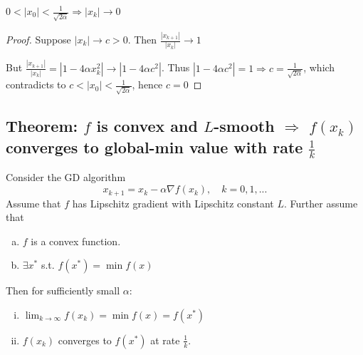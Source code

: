 \documentclass[11pt]{elegantbook}
\begin{document}
\begin{proposition}
    $0<|x_0|<\frac{1}{\sqrt{2\alpha}} \Rightarrow |x_k| \rightarrow	0$
\end{proposition}
\begin{proof}
Suppose $|x_k| \rightarrow	c>0$. Then $\frac{|x_{k+1}|}{|x_k|} \rightarrow	1$

But $\frac{|x_{k+1}|}{|x_k|} = |1-4\alpha x_k^2| \rightarrow |1-4\alpha c^2|$. Thus $|1-4\alpha c^2|=1 \Rightarrow	c=\frac{1}{\sqrt{2\alpha}}$, which contradicts to $c<|x_0|<\frac{1}{\sqrt{2\alpha}}$, hence $c=0$

\end{proof}

\subsection{Theorem: $f$ is convex and $L$-smooth $\Rightarrow$ $f(x_k)$ converges to global-min value with rate $\frac{1}{k}$}
\begin{theorem}
Consider the GD algorithm $$x_{k+1}=x_k-\alpha \nabla f(x_k),\quad k=0,1,...$$
Assume that $f$ has Lipschitz gradient with Lipschitz constant $L$. Further assume that
\begin{enumerate}[(a)]
    \item $f$ is a convex function.
    \item $\exists x^*$ s.t. $f(x^*)=\min f(x)$
\end{enumerate}
Then for sufficiently small $\alpha$:
\begin{enumerate}[(i)]
    \item $\lim_{k \rightarrow \infty} f(x_k)=\min f(x)=f(x^*)$
    \item $f(x_k)$ converges to $f(x^*)$ at rate $\frac{1}{k}$.
\end{enumerate}
\end{theorem}
\end{document}
